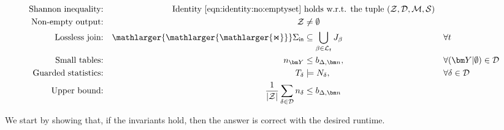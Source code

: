 \documentclass[10pt,a4paper]{article}
\newcommand{\calM}{\mathcal M}
\newcommand{\calS}{\mathcal S}
\newcommand{\calD}{\mathcal D}
\newcommand{\calL}{\mathcal L}
\newcommand{\calZ}{\mathcal Z}
\newcommand{\bigjoin}{\mathlarger{\mathlarger{\mathlarger{\Join}}}}
\newcommand{\inn}{\text{\sf in}}
\begin{document}
\begin{align}
  \mbox{Shannon inequality:} && \mbox{Identity~\eqref{eqn:identity:no:emptyset} } & \mbox{holds
w.r.t. the tuple $(\calZ, \calD, \calM, \calS)$} \label{eq:shannon:invariant}\\
  \mbox{Non-empty output:} && \calZ & \neq \emptyset \label{eq:invariant:output}\\
  \mbox{Lossless join:} &&  \bigjoin \Sigma_{\inn} & \subseteq
  \bigcup_{\beta\in \calL_t} J_\beta
  && \forall t \label{eq:invariant:join}\\
  \mbox{Small tables:} &&
    n_{\bm Y} &\leq b_{\Delta,\bm n}, && \forall (\bm Y| \emptyset) \in \calD \label{eq:invariant:small}\\
  \mbox{Guarded statistics:} && T_\delta &\models N_\delta, && \forall \delta \in \calD \label{eq:invariant:stats}\\
  \mbox{Upper bound:} && \frac{1}{|\calZ|}\sum_{\delta\in \calD} n_{\delta} &\leq b_{\Delta, \bm n}\label{eq:invariant:upper:bound}
\end{align}


We start by showing that, if the invariants hold, then the answer is correct with the
desired runtime.
\end{document}
